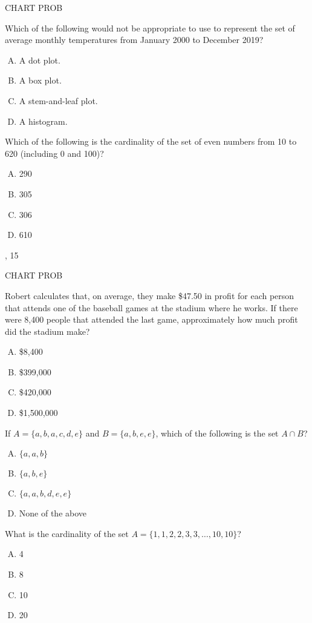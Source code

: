 \documentclass[12pt,letterpaper]{exam}
\begin{document}
\begin{questions}
\question CHART PROB

\question Which of the following would not be appropriate to use to represent the set of average monthly temperatures from January 2000 to December 2019?
	\begin{enumerate}[A.]
	\item A dot plot.
	\item A box plot.
	\item A stem-and-leaf plot.
	\item A histogram.
	\end{enumerate}

\question Which of the following is the cardinality of the set of even numbers from 10 to 620 (including 0 and 100)?
	\begin{enumerate}[A.]
	\item 290
	\item 305
	\item 306
	\item 610
	\end{enumerate}

, 15

\question CHART PROB

\question Robert calculates that, on average, they make \$47.50 in profit for each person that attends one of the baseball games at the stadium where he works. If there were 8,400 people that attended the last game, approximately how much profit did the stadium make?
	\begin{enumerate}[A.]
	\item \$8,400
	\item \$399,000
	\item \$420,000
	\item \$1,500,000
	\end{enumerate}

\question If $A= \{ a, b, a, c, d, e \}$ and $B= \{ a, b, e, e \}$, which of the following is the set $A \cap B$?
	\begin{enumerate}[A.]
	\item $\{ a, a, b \}$
	\item $\{ a, b, e \}$
	\item $\{ a, a, b, d, e, e \}$
	\item None of the above
	\end{enumerate}

\question What is the cardinality of the set $A= \{ 1, 1, 2, 2, 3, 3, \ldots, 10, 10 \}$?
	\begin{enumerate}[A.]
	\item 4
	\item 8
	\item 10
	\item 20
	\end{enumerate}
 


\end{questions}
\end{document}
